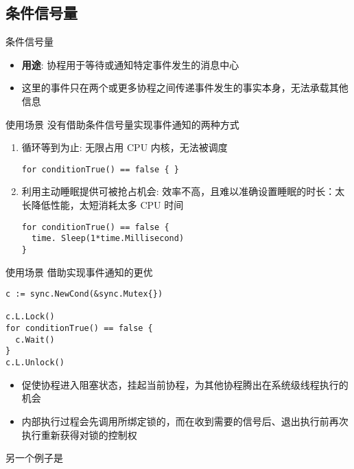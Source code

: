 \subsection{条件信号量\Cond}
\begin{frame}{条件信号量\Cond}
    \begin{itemize}
        \item \textbf{用途}: 协程用于等待或通知特定事件发生的消息中心
        \item 这里的事件只在两个或更多协程之间传递事件发生的事实本身，\alert{无法承载其他信息}
    \end{itemize}
\end{frame}

\begin{frame}[fragile]{使用场景}
   没有借助条件信号量实现事件通知的两种方式
   
   \begin{enumerate}
       \item {}循环等到为止: 无限占用 CPU 内核，\alert{无法被调度}
\begin{lstlisting}
for conditionTrue() == false { }    
\end{lstlisting}
       \item 利用主动睡眠提供可被抢占机会: \alert{效率不高，且难以准确设置睡眠的时长}：太长降低性能，太短消耗太多 CPU 时间    
\begin{lstlisting}
for conditionTrue() == false {
  time. Sleep(1*time.Millisecond)
}
\end{lstlisting}
   \end{enumerate}
\end{frame}

\begin{frame}[fragile]{使用场景}
   借助\Cond 实现事件通知的更优
\begin{lstlisting}
c := sync.NewCond(&sync.Mutex{})

c.L.Lock()
for conditionTrue() == false {
  c.Wait()
}
c.L.Unlock()
\end{lstlisting}

\begin{itemize}
    \item {}促使协程进入阻塞状态，挂起当前协程，为其他协程腾出在系统级线程执行的机会
    \item {}内部执行过程会先调用所绑定锁的，而在收到需要的信号后、退出执行前再次执行重新获得对锁的控制权
\end{itemize}

另一个例子是
\end{frame}

